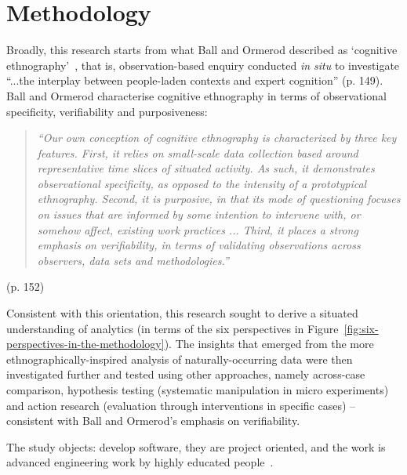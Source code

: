 \section{Methodology}
Broadly, this research starts from what Ball and Ormerod described as `cognitive ethnography'~\citep{ball2000_putting_ethnography_to_work_cognitive_ethnography}, that is, observation-based enquiry conducted \textit{in situ} to investigate ``...the interplay between people-laden contexts and expert cognition'' (p. 149). Ball and Ormerod characterise cognitive ethnography in terms of observational specificity, verifiability and purposiveness: 

\begin{quote}
  \textit{``Our own conception of cognitive ethnography is characterized by three key features. First, it relies on small-scale data collection based around representative time slices of situated activity. As such, it demonstrates observational specificity, as opposed to the intensity of a prototypical ethnography. Second, it is purposive, in that its mode of questioning focuses on issues that are informed by some intention to intervene with, or somehow affect, existing work practices ... Third, it places a strong emphasis on verifiability, in terms of validating observations across observers, data sets and methodologies.''}    
\end{quote} %
 (p. 152)

Consistent with this orientation, this research sought to derive a situated understanding of analytics (in terms of the six perspectives in Figure~\ref{fig:six-perspectives-in-the-methodology}). The insights that emerged from the more ethnographically-inspired analysis of naturally-occurring data were then investigated further and tested using other approaches, namely across-case comparison, hypothesis testing (systematic manipulation in micro experiments) and action research (evaluation through interventions in specific cases) -- consistent with Ball and Ormerod's emphasis on verifiability.  

The study objects: develop software, they are project oriented, and the work is advanced engineering work by highly educated people~\citep[see pp. 132-133]{runeson_2008_guidelines_for_conducting_and_reporting_case_study_research_in_sw_eng}. %

